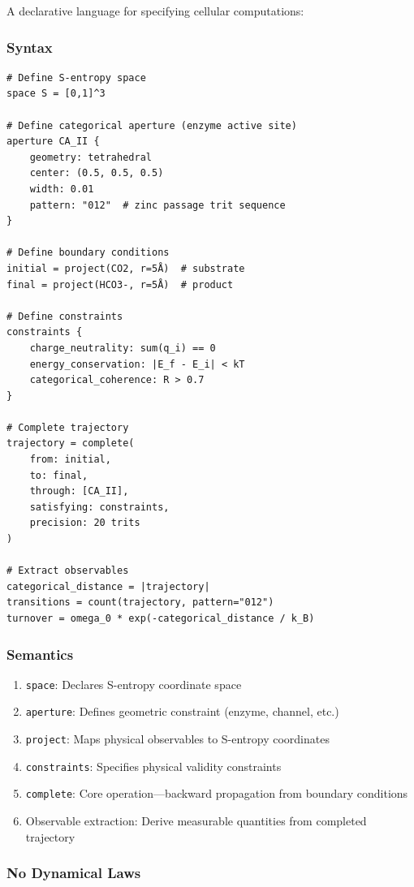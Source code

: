 \documentclass[11pt,twocolumn,a4paper]{article}
\theoremstyle{remark}
\begin{document}
A declarative language for specifying cellular computations:

\subsubsection{Syntax}

\begin{verbatim}
# Define S-entropy space
space S = [0,1]^3

# Define categorical aperture (enzyme active site)
aperture CA_II {
    geometry: tetrahedral
    center: (0.5, 0.5, 0.5)
    width: 0.01
    pattern: "012"  # zinc passage trit sequence
}

# Define boundary conditions
initial = project(CO2, r=5Å)  # substrate
final = project(HCO3-, r=5Å)  # product

# Define constraints
constraints {
    charge_neutrality: sum(q_i) == 0
    energy_conservation: |E_f - E_i| < kT
    categorical_coherence: R > 0.7
}

# Complete trajectory
trajectory = complete(
    from: initial,
    to: final,
    through: [CA_II],
    satisfying: constraints,
    precision: 20 trits
)

# Extract observables
categorical_distance = |trajectory|
transitions = count(trajectory, pattern="012")
turnover = omega_0 * exp(-categorical_distance / k_B)
\end{verbatim}

\subsubsection{Semantics}

\begin{enumerate}
\item \texttt{space}: Declares S-entropy coordinate space
\item \texttt{aperture}: Defines geometric constraint (enzyme, channel, etc.)
\item \texttt{project}: Maps physical observables to S-entropy coordinates
\item \texttt{constraints}: Specifies physical validity constraints
\item \texttt{complete}: Core operation---backward propagation from boundary conditions
\item Observable extraction: Derive measurable quantities from completed trajectory
\end{enumerate}

\subsubsection{No Dynamical Laws}
\end{document}
